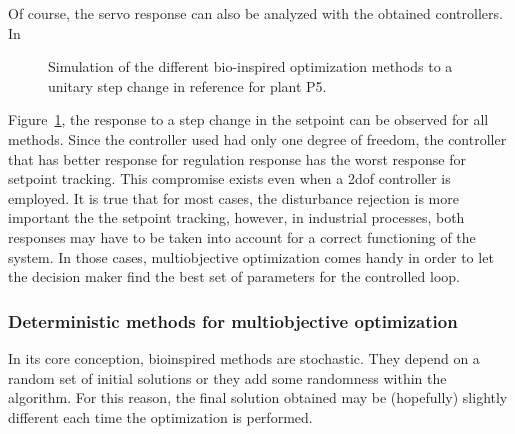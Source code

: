Of course, the servo response can also be analyzed with the obtained controllers. In %
%
\begin{figure}[tb]%
	\centering
	\caption{Simulation of the different bio-inspired optimization methods to a unitary step change in reference for plant P5.}%
	\label{fig:Reference}%
\end{figure}
%
Figure~\ref{fig:Reference}, the response to a step change in the setpoint can be observed for all methods. Since the controller used had only one degree of freedom, the controller that has better response for regulation response has the worst response for setpoint tracking. This compromise exists even when a \gls{2dof} controller is employed. It is true that for most cases, the disturbance rejection is more important the the setpoint tracking, however, in industrial processes, both responses may have to be taken into account for a correct functioning of the system. In those cases, multiobjective optimization comes handy in order to let the decision maker find the best set of parameters for the controlled loop.

\subsubsection{Deterministic methods for multiobjective optimization}

In its core conception, bioinspired methods are stochastic. They depend on a random set of initial solutions or they add some randomness within the algorithm. For this reason, the final solution obtained may be (hopefully) slightly different each time the optimization is performed.

